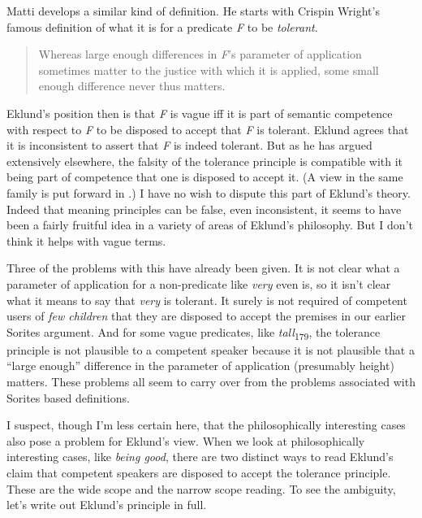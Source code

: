 Matti \citet{Eklund2005} develops a similar kind of definition. He starts with Crispin Wright's \citeyearpar{Wright1975} famous definition of what it is for a predicate \textit{F} to be \textit{tolerant}.

\begin{quote}
Whereas large enough differences in \textit{F}'s parameter of application sometimes matter to the justice with which it is applied, some small enough difference never thus matters.
\end{quote}

\noindent Eklund's position then is that \textit{F} is vague iff it is part of semantic competence with respect to \textit{F} to be disposed to accept that \textit{F} is tolerant. Eklund agrees that it is inconsistent to assert that \textit{F} is indeed tolerant. But as he has argued extensively elsewhere, the falsity of the tolerance principle is compatible with it being part of competence that one is disposed to accept it. (A view in the same family is put forward in \citet{Sorensen2001}.) I have no wish to dispute this part of Eklund's theory. Indeed that meaning principles can be false, even inconsistent, it seems to have been a fairly fruitful idea in a variety of areas of Eklund's philosophy. But I don't think it helps with vague terms.

Three of the problems with this have already been given. It is not clear what a parameter of application for a non-predicate like \textit{very} even is, so it isn't clear what it means to say that \textit{very} is tolerant. It surely is not required of competent users of \textit{few children} that they are disposed to accept the premises in our earlier Sorites argument. And for some vague predicates, like \textit{tall}\textsubscript{179}, the tolerance principle is not plausible to a competent speaker because it is not plausible that a ``large enough'' difference in the parameter of application (presumably height) matters. These problems all seem to carry over from the problems associated with Sorites based definitions.

I suspect, though I'm less certain here, that the philosophically interesting cases also pose a problem for Eklund's view. When we look at philosophically interesting cases, like \textit{being good}, there are two distinct ways to read Eklund's claim that competent speakers are disposed to accept the tolerance principle. These are the wide scope and the narrow scope reading. To see the ambiguity, let's write out Eklund's principle in full.

